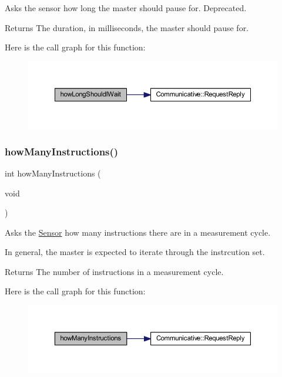 Asks the sensor how long the master should pause for. Deprecated. 

\begin{DoxyReturn}{Returns}
The duration, in milliseconds, the master should pause for. 
\end{DoxyReturn}
Here is the call graph for this function\+:
\nopagebreak
\begin{figure}[H]
\begin{center}
\leavevmode
\includegraphics[width=350pt]{class_instructor_a2e9afbb8e6ce1c671e8e9dc29cf4715f_cgraph}
\end{center}
\end{figure}
\mbox{\label{class_instructor_abfe73e27d6364bf5cad80f30f6833ec8}} 
\subsubsection{\texorpdfstring{howManyInstructions()}{howManyInstructions()}}
{\footnotesize\ttfamily int how\+Many\+Instructions (\begin{DoxyParamCaption}\item[{void}]{ }\end{DoxyParamCaption})}



Asks the \mbox{\hyperlink{class_sensor}{Sensor}} how many instructions there are in a measurement cycle. 

In general, the master is expected to iterate through the instrcution set. \begin{DoxyReturn}{Returns}
The number of instructions in a measurement cycle. 
\end{DoxyReturn}
Here is the call graph for this function\+:
\nopagebreak
\begin{figure}[H]
\begin{center}
\leavevmode
\includegraphics[width=350pt]{class_instructor_abfe73e27d6364bf5cad80f30f6833ec8_cgraph}
\end{center}
\end{figure}
\mbox{\label{class_instructor_a43cbe18547a30108219f3aa2945fc9ca}} 
